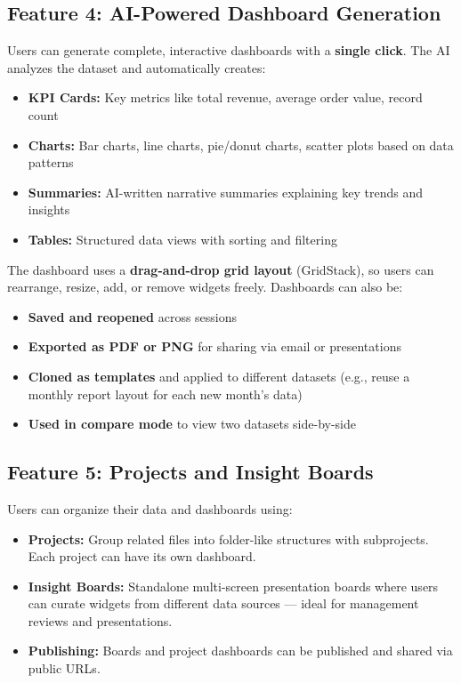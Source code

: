 \documentclass[12pt,a4paper]{report}
\begin{document}
\subsection{Feature 4: AI-Powered Dashboard Generation}

Users can generate complete, interactive dashboards with a \textbf{single click}. The AI analyzes the dataset and automatically creates:

\begin{itemize}[leftmargin=1.5cm]
    \item \textbf{KPI Cards:} Key metrics like total revenue, average order value, record count
    \item \textbf{Charts:} Bar charts, line charts, pie/donut charts, scatter plots based on data patterns
    \item \textbf{Summaries:} AI-written narrative summaries explaining key trends and insights
    \item \textbf{Tables:} Structured data views with sorting and filtering
\end{itemize}

The dashboard uses a \textbf{drag-and-drop grid layout} (GridStack), so users can rearrange, resize, add, or remove widgets freely. Dashboards can also be:

\begin{itemize}[leftmargin=1.5cm]
    \item \textbf{Saved and reopened} across sessions
    \item \textbf{Exported as PDF or PNG} for sharing via email or presentations
    \item \textbf{Cloned as templates} and applied to different datasets (e.g., reuse a monthly report layout for each new month's data)
    \item \textbf{Used in compare mode} to view two datasets side-by-side
\end{itemize}

\subsection{Feature 5: Projects and Insight Boards}

Users can organize their data and dashboards using:

\begin{itemize}[leftmargin=1.5cm]
    \item \textbf{Projects:} Group related files into folder-like structures with subprojects. Each project can have its own dashboard.
    \item \textbf{Insight Boards:} Standalone multi-screen presentation boards where users can curate widgets from different data sources --- ideal for management reviews and presentations.
    \item \textbf{Publishing:} Boards and project dashboards can be published and shared via public URLs.
\end{itemize}
\end{document}
